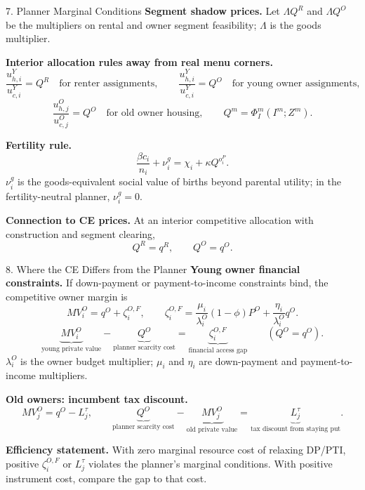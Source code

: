 \documentclass[11pt,aspectratio=169]{beamer}
\newcommand{\1}{\mathbf 1}
\begin{document}
\begin{frame}{7. Planner Marginal Conditions}
\footnotesize
\textbf{Segment shadow prices.}
Let \(\Lambda Q^R\) and \(\Lambda Q^O\) be the multipliers on rental and owner segment feasibility; \(\Lambda\) is the goods multiplier.

\smallskip
\textbf{Interior allocation rules away from real menu corners.}
\[
\frac{u_{h,i}^Y}{u_{c,i}^Y}=Q^R
\quad\text{for renter assignments},
\qquad
\frac{u_{h,i}^Y}{u_{c,i}^Y}=Q^O
\quad\text{for young owner assignments},
\]
\[
\frac{u_{h,j}^O}{u_{c,j}^O}=Q^O
\quad\text{for old owner housing},
\qquad
Q^m=\Phi_I^m(I^m;Z^m).
\]

\smallskip
\textbf{Fertility rule.}
\[
\frac{\beta c_i}{n_i}+\nu_i^g=\chi_i+\kappa Q^{o_i^P}.
\]
\(\nu_i^g\) is the goods-equivalent social value of births beyond parental utility; in the fertility-neutral planner, \(\nu_i^g=0\).

\smallskip
\textbf{Connection to CE prices.}
At an interior competitive allocation with construction and segment clearing,
\[
Q^R=q^R,\qquad Q^O=q^O.
\]
\end{frame}

\begin{frame}{8. Where the CE Differs from the Planner}
\footnotesize
\textbf{Young owner financial constraints.}
If down-payment or payment-to-income constraints bind, the competitive owner margin is
\[
MV_i^O=q^O+\zeta_i^{O,F},
\qquad
\zeta_i^{O,F}
=
\frac{\mu_i}{\lambda_i^O}(1-\phi)P^O
+
\frac{\eta_i}{\lambda_i^O}q^O.
\]
\[
\underbrace{MV_i^O}_{\text{young private value}}
-
\underbrace{Q^O}_{\text{planner scarcity cost}}
=
\underbrace{\zeta_i^{O,F}}_{\text{financial access gap}}
\qquad (Q^O=q^O).
\]
\(\lambda_i^O\) is the owner budget multiplier; \(\mu_i\) and \(\eta_i\) are down-payment and payment-to-income multipliers.

\smallskip
\textbf{Old owners: incumbent tax discount.}
\[
MV_j^O=q^O-L_j^\tau,
\qquad
\underbrace{Q^O}_{\text{planner scarcity cost}}
-
\underbrace{MV_j^O}_{\text{old private value}}
=
\underbrace{L_j^\tau}_{\text{tax discount from staying put}}.
\]

\smallskip
\textbf{Efficiency statement.}
With zero marginal resource cost of relaxing DP/PTI, positive \(\zeta_i^{O,F}\) or \(L_j^\tau\) violates the planner's marginal conditions. With positive instrument cost, compare the gap to that cost.
\end{frame}
\end{document}
